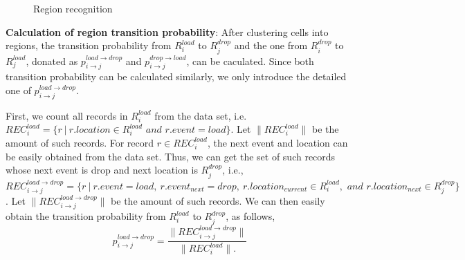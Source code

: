 \begin{figure}[!t]
\centering
{}
\centering
\caption{Region recognition}\label{figure_region_recognizition}
\end{figure}

\textbf{Calculation of region transition probability}: After clustering cells into regions, the transition probability from $R_i^{load}$ to $R_j^{drop}$ and the one from $R_i^{drop}$ to $R_j^{load}$, donated as $p_{i\rightarrow j}^{load\rightarrow drop}$ and $p_{i\rightarrow j}^{drop\rightarrow load}$, can be caculated. Since both transition probability can be calculated similarly, we only introduce the detailed one of $p_{i\rightarrow j}^{load\rightarrow drop}$.

First, we count all records in $R_i^{load}$ from the data set,  i.e. $REC_i^{load}=\{r~|~r.location\in{R_i^{load} \textit{ and }  r.event=load}\}$. Let $\|REC_i^{load}\|$ be the amount of such records. For record $r \in REC_i^{load}$, the next event and location can be easily obtained from the data set. Thus, we can get the set of such records whose next event is drop and next location is $R_j^{drop}$, i.e., $REC_{i\to j}^{load\to drop}=\{r~|~r.event=load,~r.event_{next}=drop,~r.location_{current}\in R_i^{load}, \textit{ and }  r.location_{next}\in R_j^{drop}\}$. Let $\|REC_{i\to j}^{load\to drop}\|$ be the amount of such records. We can then easily obtain the transition probability from $R_i^{load}$ to $R_j^{drop}$, as follows,
\[p_{i \to j}^{load \to drop} = \frac{\|REC_{i\to j}^{load\to drop}\|}{\|REC_i^{load}\|.}\]



